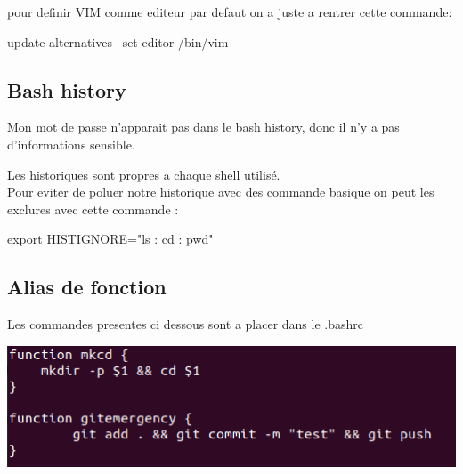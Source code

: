 \documentclass{article}
\begin{document}
 pour definir VIM comme editeur par defaut on a juste a rentrer cette commande: \par update-alternatives --set editor /bin/vim
 
 
 
 \subsection{\large{Bash history}}
 
 Mon mot de passe n'apparait pas dans le bash history, donc il n'y a pas d'informations sensible.\par
 Les historiques sont propres a chaque shell utilisé. \\
 
 Pour eviter de poluer notre historique avec des commande basique on peut les exclures avec cette commande : \par
 export HISTIGNORE="ls : cd : pwd"
 
  
  
  \subsection{\large{Alias de fonction}}
  Les commandes presentes ci dessous sont a placer dans le .bashrc
  
  \begin{center}
        \includegraphics[scale=0.7]{Images/function.png}
  \end{center}
    
 
 
\end{document}
